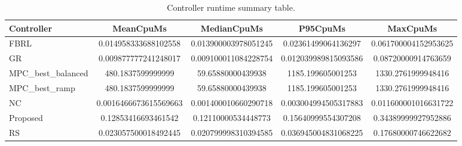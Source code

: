 \begin{table}[t]
\centering
\caption{Controller runtime summary table.}
\label{tab:runtime_auto}
\begin{tabular}{lcccc}
\toprule
Controller & MeanCpuMs & MedianCpuMs & P95CpuMs & MaxCpuMs \\
\midrule
FBRL & 0.014958333688102558 & 0.013900003978051245 & 0.02361499064136297 & 0.061700004152953625 \\
GR & 0.009877777241248017 & 0.009100011084228754 & 0.012039989815093586 & 0.08720000914763659 \\
MPC\_best\_balanced & 480.1837599999999 & 59.65880000439938 & 1185.199605001253 & 1330.2761999948416 \\
MPC\_best\_ramp & 480.1837599999999 & 59.65880000439938 & 1185.199605001253 & 1330.2761999948416 \\
NC & 0.0016466673615569663 & 0.001400010660290718 & 0.003004994505317883 & 0.011600001016631722 \\
Proposed & 0.12853416693461542 & 0.12110000534448773 & 0.15640999554307208 & 0.34389999927952886 \\
RS & 0.023057500018492445 & 0.020799998310394585 & 0.036945004831068225 & 0.17680000746622682 \\
\bottomrule
\end{tabular}
\end{table}